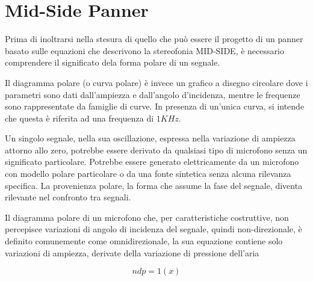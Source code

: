 \section{Mid-Side Panner}
\label{sec:mspanner}

Prima di inoltrarsi nella stesura di quello che può essere il progetto di un
panner basato sulle equazioni che descrivono la stereofonia MID-SIDE, è
necessario comprendere il significato dela forma polare di un segnale.

Il diagramma polare (o curva polare) è invece un grafico a disegno circolare
dove i parametri sono dati dall’ampiezza e dall’angolo d’incidenza, mentre le
frequenze sono rappresentate da famiglie di curve. In presenza di un’unica curva,
si intende che questa è riferita ad una frequenza di $1KHz$. %

Un singolo segnale, nella sua oscillazione, espressa nella variazione di ampiezza
attorno allo zero, potrebbe essere derivato da qualsiasi tipo di microfono senza
un significato particolare. Potrebbe essere generato elettricamente da un
microfono con modello polare particolare o da una fonte sintetica senza
alcuna rilevanza specifica. La provenienza polare, la forma che assume la fase
del segnale, diventa rilevante nel confronto tra segnali.

Il diagramma polare di un microfono che, per caratteristiche costruttive, non
percepisce variazioni di angolo di incidenza del segnale, quindi non-direzionale,
è definito comunemente come omnidirezionale, la sua equazione contiene solo
variazioni di ampiezza, derivate della variazione di pressione dell'aria

\begin{equation}
ndp = 1(x)
\label{eq:omni}
\end{equation}

